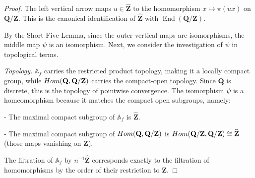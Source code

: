 \documentclass[10pt,a4paper]{amsart}
\newcommand{\A}{\mathbb{A}}
\def\Hom{\rm{Hom}}
\newcommand{\Q}{\mathbf{Q}}
\newcommand{\Z}{\mathbf{Z}}
\newcommand{\Zhat}{\widehat{\Z}}
\begin{document}
\begin{proof}
 The left vertical arrow maps $u \in \Zhat$ to the homomorphism $x \mapsto \pi(ux)$ on $\Q/\Z$. This is the canonical identification of $\Zhat$ with $\operatorname{End}(\Q/\Z)$.

By the Short Five Lemma, since the outer vertical maps are isomorphisms, the middle map $\psi$ is an isomorphism.
Next, we consider the investigation of $\psi$ in topological terms.\vspace{.02in}

\emph{Topology.}
$\A_f$ carries the restricted product topology, making it a locally compact group, while 
$\Hom(\Q, \Q/\Z)$ carries the compact-open topology. Since $\Q$ is discrete, this is the topology of pointwise convergence.
The isomorphism $\psi$ is a homeomorphism because it matches the compact open subgroups, namely:\vspace{.02in}

- The maximal compact subgroup of $\A_f$ is $\Zhat$.

- The maximal compact subgroup of $\Hom(\Q, \Q/\Z)$ is $\Hom(\Q/\Z, \Q/\Z) \cong \Zhat$ (those maps vanishing on $\Z$).

The filtration of $\A_f$ by $n^{-1}\Zhat$ corresponds exactly to the filtration of homomorphisms by the order of their restriction to $\Z$.
\end{proof}
\end{document}
